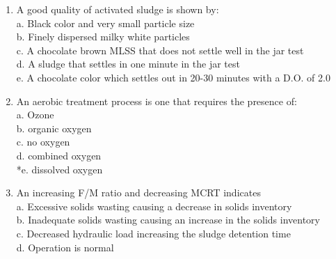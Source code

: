 \begin{tcolorbox}[breakable, enhanced,
colframe=blue!25,
colback=blue!10,
coltitle=blue!20!black,  
title= Chapter Assessment]
\begin{enumerate}
\item A good quality of activated sludge is shown by: \\
a. Black color and very small particle size \\
b. Finely dispersed milky white particles \\
c. A chocolate brown MLSS that does not settle well in the jar test \\
d. A sludge that settles in one minute in the jar test \\
e. A chocolate color which settles out in 20-30 minutes with a D.O. of 2.0 \\

\item An aerobic treatment process is one that requires the presence of: \\
a. Ozone \\
b. organic oxygen \\
c. no oxygen \\
d. combined oxygen \\
*e. dissolved oxygen \\

\item An increasing F/M ratio and decreasing MCRT indicates \\
a. Excessive solids wasting causing a decrease in solids inventory \\
b. Inadequate solids wasting causing an increase in the solids inventory \\
c. Decreased hydraulic load increasing the sludge detention time \\
d. Operation is normal \\

\end{enumerate}
\end{tcolorbox}